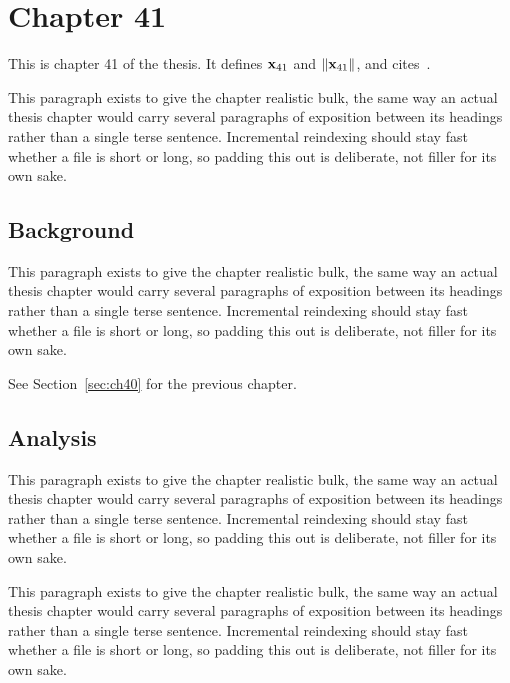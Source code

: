 \section{Chapter 41}
\label{sec:ch41}

This is chapter 41 of the thesis. It defines $\mathbf{x}_{41}$ and $\lVert \mathbf{x}_{41} \rVert$, and cites~\cite{ref1}.

This paragraph exists to give the chapter realistic bulk, the same way an actual thesis chapter would carry several paragraphs of exposition between its headings rather than a single terse sentence. Incremental reindexing should stay fast whether a file is short or long, so padding this out is deliberate, not filler for its own sake.

\subsection{Background}
\label{sec:ch41:background}

This paragraph exists to give the chapter realistic bulk, the same way an actual thesis chapter would carry several paragraphs of exposition between its headings rather than a single terse sentence. Incremental reindexing should stay fast whether a file is short or long, so padding this out is deliberate, not filler for its own sake.

See Section~\ref{sec:ch40} for the previous chapter.

\subsection{Analysis}
\label{sec:ch41:analysis}

This paragraph exists to give the chapter realistic bulk, the same way an actual thesis chapter would carry several paragraphs of exposition between its headings rather than a single terse sentence. Incremental reindexing should stay fast whether a file is short or long, so padding this out is deliberate, not filler for its own sake.

This paragraph exists to give the chapter realistic bulk, the same way an actual thesis chapter would carry several paragraphs of exposition between its headings rather than a single terse sentence. Incremental reindexing should stay fast whether a file is short or long, so padding this out is deliberate, not filler for its own sake.
